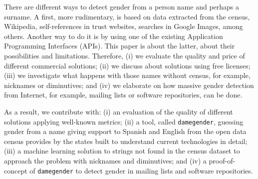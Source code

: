 \documentclass[a4paper]{article}
\begin{document}
There are different ways to detect gender from a person name and perhaps a surname.
A first, more rudimentary, is based on data extracted from the census, Wikipedia, self-references in trust websites, searches in Google Images, among others.
Another way to do it is by using one of the existing Application Programming Interfaces (APIs).
This paper is about the latter, about their possibilities and limitations.
Therefore, (i) we evaluate the quality and price of different commercial solutions;
(ii) we discuss about solutions using free licenses;
(iii) we investigate what happens with those names without census, for example, nicknames or diminutives; and
(iv) we elaborate on how massive gender detection from Internet, for example, mailing
  lists or software repositories, can be done.

As a result, we contribute with: 
(i) an evaluation of the quality of different solutions applying well-known metrics;
(ii) a tool, called \texttt{damegender}, guessing gender from a name giving support to Spanish and
  English from the open data census provides by the states built to understand 
  current technologies in detail;
(iii) a machine learning solution to strings not found in the
  census dataset to approach the problem with nicknames and diminutives; and 
(iv) a proof-of-concept of \texttt{damegender} to detect
  gender in mailing lists and software repositories.


%
\end{document}
